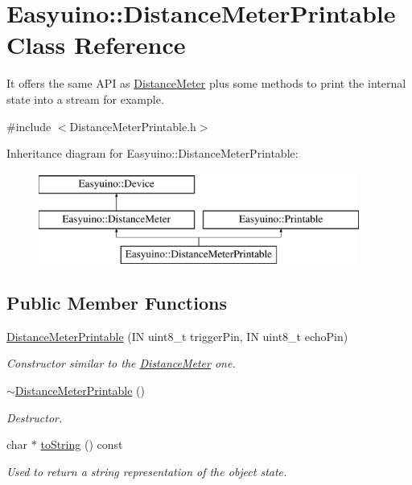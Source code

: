 \hypertarget{class_easyuino_1_1_distance_meter_printable}{}\section{Easyuino\+:\+:Distance\+Meter\+Printable Class Reference}
\label{class_easyuino_1_1_distance_meter_printable}


It offers the same A\+PI as \hyperlink{class_easyuino_1_1_distance_meter}{Distance\+Meter} plus some methods to print the internal state into a stream for example.  




{\ttfamily \#include $<$Distance\+Meter\+Printable.\+h$>$}

Inheritance diagram for Easyuino\+:\+:Distance\+Meter\+Printable\+:\begin{figure}[H]
\begin{center}
\leavevmode
\includegraphics[height=3.000000cm]{class_easyuino_1_1_distance_meter_printable}
\end{center}
\end{figure}
\subsection*{Public Member Functions}
\begin{DoxyCompactItemize}
\item 
\hyperlink{class_easyuino_1_1_distance_meter_printable_a367fe13996801c142f687234390bfc8c}{Distance\+Meter\+Printable} (IN uint8\+\_\+t trigger\+Pin, IN uint8\+\_\+t echo\+Pin)
\begin{DoxyCompactList}\small\item\em Constructor similar to the \hyperlink{class_easyuino_1_1_distance_meter}{Distance\+Meter} one. \end{DoxyCompactList}\item 
\mbox{\label{class_easyuino_1_1_distance_meter_printable_a06a3c8df8ddf71d8affe832b57e6f4ab}} 
\hyperlink{class_easyuino_1_1_distance_meter_printable_a06a3c8df8ddf71d8affe832b57e6f4ab}{$\sim$\+Distance\+Meter\+Printable} ()
\begin{DoxyCompactList}\small\item\em Destructor. \end{DoxyCompactList}\item 
char $\ast$ \hyperlink{class_easyuino_1_1_distance_meter_printable_a42bb42319353c84294975ed5edc3a84c}{to\+String} () const
\begin{DoxyCompactList}\small\item\em Used to return a string representation of the object state. \end{DoxyCompactList}\end{DoxyCompactItemize}
